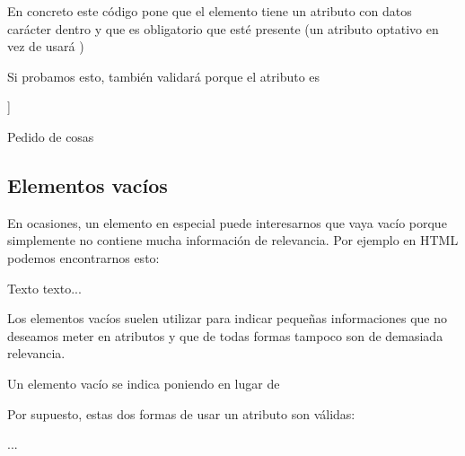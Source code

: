 \documentclass[letterpaper,10pt,spanish]{sphinxmanual}
\begin{document}
En concreto este código pone que el elemento  tiene un atributo  con datos carácter dentro y que es obligatorio que esté presente (un atributo optativo en vez de  usará )

Si probamos esto, también validará porque el atributo es 

\begin{sphinxVerbatim}[commandchars=\\\{\}]
\PYG{c+cp}{\PYGZlt{}!DOCTYPE pedido[}
]\PYGZgt{}

        Pedido de cosas
\end{sphinxVerbatim}


\subsection{Elementos vacíos}
\label{\detokenize{tema5:elementos-vacios}}
En ocasiones, un elemento en especial puede interesarnos que vaya vacío porque simplemente no contiene mucha información de relevancia. Por ejemplo en HTML podemos encontrarnos esto:

\begin{sphinxVerbatim}[commandchars=\\\{\}]
Texto texto...
\end{sphinxVerbatim}

Los elementos vacíos suelen utilizar para indicar pequeñas informaciones que no deseamos meter en atributos y que de todas formas tampoco son de demasiada relevancia.

Un elemento vacío se indica poniendo  en lugar de 

Por supuesto, estas dos formas de usar un atributo son válidas:

\begin{sphinxVerbatim}[commandchars=\\\{\}]
        ...
\end{sphinxVerbatim}
\end{document}
